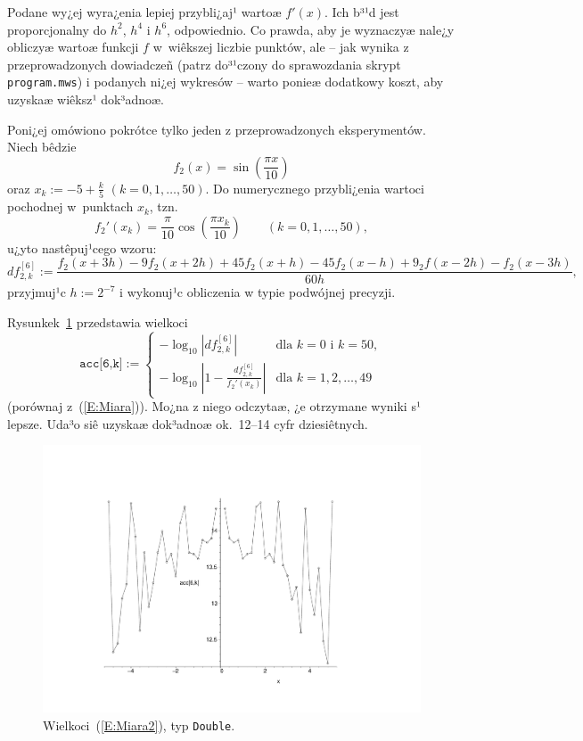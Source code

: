 \documentclass[11pt,leqno]{article}
\newcommand{\eqref}[1]{{\rm (\ref{#1})}}
\begin{document}
Podane wy¿ej wyra¿enia lepiej przybli¿aj¹ wartoæ $f'(x)$. Ich b³¹d jest
proporcjonalny do $h^2$, $h^4$ i $h^6$, odpowiednio. Co prawda, aby je wyznaczyæ
nale¿y obliczyæ wartoæ funkcji $f$ w~wiêkszej liczbie punktów, ale -- jak
wynika z przeprowadzonych dowiadczeñ (patrz do³¹czony do sprawozdania skrypt
\texttt{program.mws}) i podanych ni¿ej wykresów -- warto ponieæ dodatkowy
koszt, aby uzyskaæ wiêksz¹ dok³adnoæ.

Poni¿ej omówiono pokrótce tylko jeden z przeprowadzonych eksperymentów. Niech
bêdzie
$$
f_2(x)=\sin\left(\frac{\pi x}{10}\right)
$$
oraz $x_k:=-5+\frac{k}{5}$ $(k=0,1,\ldots,50)$. Do numerycznego przybli¿enia
wartoci pochodnej w~punktach $x_k$, tzn. 
$$
f_2'(x_k)=\frac{\pi}{10}\cos\left(\frac{\pi x_k}{10}\right)\qquad
                                                            (k=0,1,\ldots,50),
$$
u¿yto nastêpuj¹cego wzoru: 
$$
df_{2,k}^{[6]}:=\frac{f_2(x+3h)-9f_2(x+2h)+45f_2(x+h)-
                                       45f_2(x-h)+9_2f(x-2h)-f_2(x-3h)}{60h},
$$
przyjmuj¹c $\displaystyle h:=2^{-7}$ i wykonuj¹c obliczenia w typie podwójnej
precyzji.

Rysunkek~\ref{W:Wyk5} przedstawia wielkoci
\begin{equation}\label{E:Miara2}
\texttt{acc[6,k]}:=
\left\{
\begin{array}{ll}
-\log_{10}\left|df_{2,k}^{[6]}\right| & \mbox{dla $k=0$ i $k=50$},\\[2ex]
\displaystyle 
-\log_{10}\left|1-\frac{df_{2,k}^{[6]}}{f_2'(x_k)}\right| & 
                                                 \mbox{dla $k=1,2,\ldots,49$}
\end{array}
\right.
\end{equation}
(porównaj z~\eqref{E:Miara}). Mo¿na z niego odczytaæ, ¿e otrzymane wyniki s¹
lepsze. Uda³o siê uzyskaæ dok³adnoæ ok.~12--14 cyfr dziesiêtnych.

\begin{center}
\begin{figure}[!ht]
\vspace{-2cm}
\hspace{-1.5cm}
\includegraphics[scale=0.65,angle=0]{wyk5.pdf}
\vspace{-2cm}
\caption{Wielkoci~\eqref{E:Miara2}, typ \texttt{Double}.}\label{W:Wyk5}
\end{figure}
\end{center}
\end{document}
